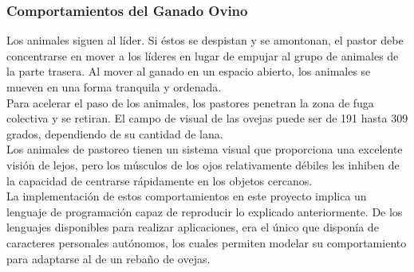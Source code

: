 \subsubsection{Comportamientos del Ganado Ovino}
\label{subsubsection:comportamientos}

Los animales siguen al líder. Si éstos se despistan y se amontonan, el pastor debe concentrarse en mover a los líderes en lugar de empujar 
al grupo de animales de la parte trasera. Al mover al ganado en un espacio abierto, los animales se mueven en una forma tranquila y ordenada.\\

Para acelerar el paso de los animales, los pastores penetran la zona de fuga colectiva y se retiran. El campo de visual de las ovejas puede 
ser de 191 hasta 309 grados, dependiendo de su cantidad de lana.\\

Los animales de pastoreo tienen un sistema visual que proporciona una excelente visión de lejos, pero los músculos de los ojos relativamente 
débiles les inhiben de la capacidad de centrarse rápidamente en los objetos cercanos.\\

La implementación de estos comportamientos en este proyecto implica un lenguaje de programación capaz de reproducir lo explicado anteriormente.
De los lenguajes disponibles para realizar aplicaciones, \lluvia{} era el único que disponía de caracteres personales autónomos, los cuales permiten modelar su 
comportamiento para adaptarse al de un rebaño de ovejas.




